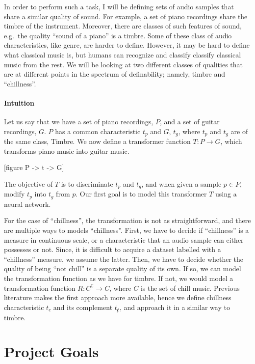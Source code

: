 \documentclass[12pt,a4paper,]{report}
\begin{document}
In order to perform such a task, I will be defining sets of audio
samples that share a similar quality of sound. For example, a set of
piano recordings share the timbre of the instrument. Moreover, there are
classes of such features of sound, e.g.~the quality ``sound of a piano''
is a timbre. Some of these class of audio characteristics, like genre,
are harder to define. However, it may be hard to define what classical
music is, but humans can recognize and classify classify classical music
from the rest. We will be looking at two different classes of qualities
that are at different points in the spectrum of definability; namely,
timbre and ``chillness''.\\

\paragraph{Intuition}

Let us say that we have a set of piano recordings, \(P\), and a set of
guitar recordings, \(G\). \(P\) has a common characteristic \(t_p\) and
\(G\), \(t_g\), where \(t_p\) and \(t_g\) are of the same class, Timbre.
We now define a transformer function \(T: P \rightarrow G\), which
transforms piano music into guitar music.

{[}figure P -\textgreater{} t -\textgreater{} G{]}

The objective of \(T\) is to discriminate \(t_p\) and \(t_g\), and when
given a sample \(p \in P\), modify \(t_p\) into \(t_g\) from \(p\). Our
first goal is to model this transformer \(T\) using a neural network.

For the case of ``chillness'', the transformation is not as
straightforward, and there are multiple ways to models ``chillness''.
First, we have to decide if ``chillness'' is a measure in continuous
scale, or a characteristic that an audio sample can either possesses or
not. Since, it is difficult to acquire a dataset labelled with a
``chillness'' measure, we assume the latter. Then, we have to decide
whether the quality of being ``not chill'' is a separate quality of its
own. If so, we can model the transformation function as we have for
timbre. If not, we would model a transformation function
\(R: C^\complement \rightarrow C\), where \(C\) is the set of chill
music. Previous literature makes the first approach more available,
hence we define chillness characteristic \(t_c\) and its complement
\(t_{\not c}\), and approach it in a similar way to timbre.

\hypertarget{project-goals}{%
\section{Project Goals}\label{project-goals}}
\end{document}
